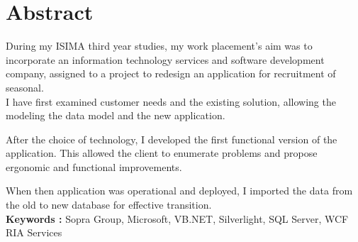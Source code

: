 \cleardoublepage

\chapter*{Abstract}

\thispagestyle{empty}



During my ISIMA third year studies, my work placement's aim was to incorporate an information technology services and software development company, assigned to a project to redesign an application for recruitment of seasonal.
\\

I have first examined customer needs and the existing solution, allowing the modeling the data model and the new application.

After the choice of technology, I developed the first functional version of the application.
This allowed the client to enumerate problems and propose ergonomic and functional improvements.

When then application was operational and deployed, I imported the data from the old to new database for effective transition.
\\

\textbf{Keywords : } Sopra Group, Microsoft, VB.NET, Silverlight, SQL Server, WCF RIA Services